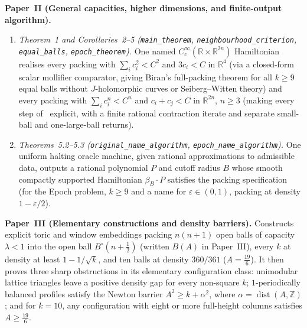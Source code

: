 \documentclass[11pt]{amsart}
\newcommand{\R}{\mathbb{R}}
\newcommand{\Z}{\mathbb{Z}}
\newcommand{\eps}{\varepsilon}
\newcommand{\Bo}{B^{\circ}}
\begin{document}
\smallskip\noindent\textbf{Paper~II (General capacities, higher dimensions, and finite-output algorithm).}
\begin{enumerate}[label=(\roman*),leftmargin=2em]
\item \emph{Theorem~1 and Corollaries~2--5 (\texttt{main\_theorem}, \texttt{neighbourhood\_criterion},
\texttt{equal\_balls}, \texttt{epoch\_theorem}).} One named $C^\infty_c(\R\times\R^{2n})$ Hamiltonian realises every
packing with $\sum_ic_i^2<C^2$ and $3c_i<C$ in $\R^4$ (via a closed-form scalar mollifier comparator, giving Biran's
full-packing theorem for all $k\ge9$ equal balls without $J$-holomorphic curves or Seiberg--Witten theory) and every
packing with $\sum_ic_i^n<C^n$ and $c_i+c_j<C$ in $\R^{2n}$, $n\ge3$ (making every step of~\cite{OpenAI2026} explicit,
with a finite rational contraction iterate and separate small-ball and one-large-ball returns).
\item \emph{Theorems~5.2--5.3 (\texttt{original\_name\_algorithm}, \texttt{epoch\_name\_algorithm}).} One uniform
halting oracle machine, given rational approximations to admissible data, outputs a rational polynomial $P$ and cutoff
radius $B$ whose smooth compactly supported Hamiltonian $\beta_B\cdot P$ satisfies the packing specification (for the
Epoch problem, $k\ge9$ and a name for $\eps\in(0,1)$, packing at density $1-\eps/2$).
\end{enumerate}

\smallskip\noindent\textbf{Paper~III (Elementary constructions and density barriers).}
Constructs explicit toric and window embeddings packing $n(n+1)$ open balls of capacity $\lambda<1$ into the open ball
$\Bo(n+\frac12)$ (written $B(A)$ in Paper~III), every $k$ at density at least $1-1/\sqrt k$, and ten balls at density
$360/361$ ($A=\frac{19}{6}$). It then proves three sharp obstructions in
its elementary configuration class: unimodular lattice triangles leave a positive density gap for every non-square $k$;
$1$-periodically balanced profiles satisfy the Newton barrier $A^2\ge k+\alpha^2$, where
$\alpha=\operatorname{dist}(A,\Z)$; and for $k=10$, any configuration with eight or more full-height columns satisfies
$A\ge\frac{19}{6}$.
\end{document}
